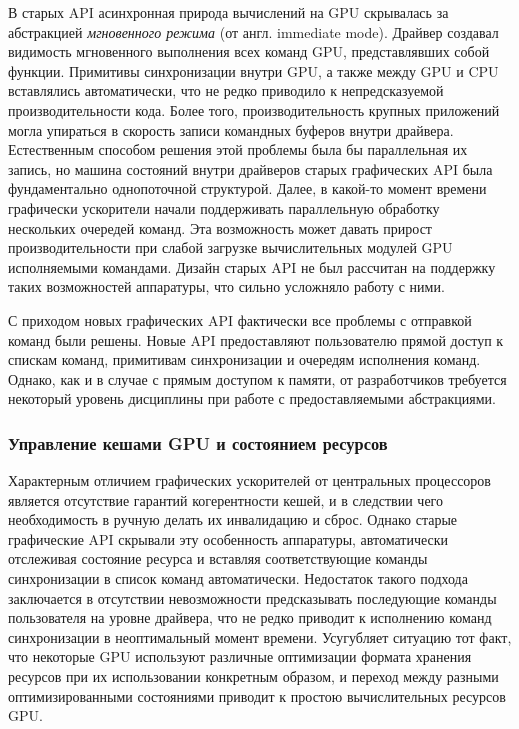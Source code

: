 В старых API асинхронная природа вычислений на GPU скрывалась за абстракцией \textit{мгновенного режима} (от англ. immediate mode).
Драйвер создавал видимость мгновенного выполнения всех команд GPU, представлявших собой функции. Примитивы синхронизации внутри GPU, а также между GPU и CPU вставлялись автоматически, что не редко приводило к непредсказуемой производительности кода. Более того, производительность крупных приложений могла упираться в скорость записи командных буферов внутри драйвера. Естественным способом решения этой проблемы была бы параллельная их запись, но машина состояний внутри драйверов старых графических API была фундаментально однопоточной структурой. Далее, в какой-то момент времени графически ускорители начали поддерживать параллельную обработку нескольких очередей команд. Эта возможность может давать прирост производительности при слабой загрузке вычислительных модулей GPU исполняемыми командами. Дизайн старых API не был рассчитан на поддержку таких возможностей аппаратуры, что сильно усложняло работу с ними.

С приходом новых графических API фактически все проблемы с отправкой команд были решены. Новые API предоставляют пользователю прямой доступ к спискам команд, примитивам синхронизации и очередям исполнения команд. Однако, как и в случае с прямым доступом к памяти, от разработчиков требуется некоторый уровень дисциплины при работе с предоставляемыми абстракциями.

\subsubsection{Управление кешами GPU и состоянием ресурсов}
Характерным отличием графических ускорителей от центральных процессоров является отсутствие гарантий когерентности кешей, и в следствии чего необходимость в ручную делать их инвалидацию и сброс. Однако старые графические API скрывали эту особенность аппаратуры, автоматически отслеживая состояние ресурса и вставляя соответствующие команды синхронизации в список команд автоматически. Недостаток такого подхода заключается в отсутствии невозможности предсказывать последующие команды пользователя на уровне драйвера, что не редко приводит к исполнению команд синхронизации в неоптимальный момент времени. Усугубляет ситуацию тот факт, что некоторые GPU используют различные оптимизации формата хранения ресурсов при их использовании конкретным образом, и переход между разными оптимизированными состояниями приводит к простою вычислительных ресурсов GPU.

